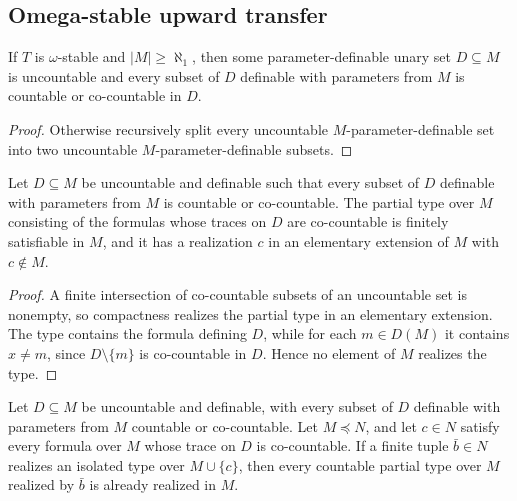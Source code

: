 \subsection{Omega-stable upward transfer}

\begin{lemma}
\label{lem:omega-stable-large-definable-almost-minimal}
If \(T\) is \(\omega\)-stable and \(|M|\geq\aleph_1\), then some
parameter-definable unary set \(D\subseteq M\) is uncountable and every
subset of \(D\) definable with parameters from \(M\) is countable or
co-countable in \(D\).
\end{lemma}

\begin{proof}
Otherwise recursively split every uncountable \(M\)-parameter-definable
set into two uncountable \(M\)-parameter-definable subsets.
\end{proof}

\begin{lemma}
\label{lem:cocountable-generic-type}
Let \(D\subseteq M\) be uncountable and definable such that every subset
of \(D\) definable with parameters from \(M\) is countable or
co-countable.  The partial type over \(M\) consisting of the formulas
whose traces on \(D\) are co-countable is finitely satisfiable in
\(M\), and it has a realization \(c\) in an elementary extension of
\(M\) with \(c\notin M\).
\end{lemma}

\begin{proof}
A finite intersection of co-countable subsets of an uncountable set is
nonempty, so compactness realizes the partial type in an elementary
extension.  The type contains the formula defining \(D\), while for
each \(m\in D(M)\) it contains \(x\neq m\), since
\(D\setminus\{m\}\) is co-countable in \(D\).  Hence no element of
\(M\) realizes the type.
\end{proof}

\begin{lemma}
\label{lem:cocountable-generic-specialization}
Let \(D\subseteq M\) be uncountable and definable, with every subset of
\(D\) definable with parameters from \(M\) countable or co-countable.
Let \(M\preceq N\), and let \(c\in N\) satisfy every formula over
\(M\) whose trace on \(D\) is co-countable.  If a finite tuple
\(\bar b\in N\) realizes an isolated type over \(M\cup\{c\}\), then
every countable partial type over \(M\) realized by \(\bar b\) is
already realized in \(M\).
\end{lemma}


